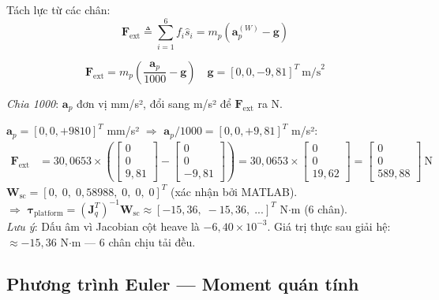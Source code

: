 \documentclass[12pt,a4paper]{article}
\newcommand{\Jq}{\mathbf{J}_q}
\newcommand{\tauv}{\boldsymbol{\tau}}
\newcommand{\Wsc}{\mathbf{W}_{\mathrm{sc}}}
\newcommand{\Fv}{\mathbf{F}}
\newcommand{\shat}{\hat{s}}
\newcommand{\ap}{\mathbf{a}_p}
\newcommand{\gv}{\mathbf{g}}
\begin{document}
Tách lực từ các chân:
\begin{equation}
  \Fv_{\text{ext}} \triangleq \sum_{i=1}^{6}f_i\shat_i = m_p(\ap^{(W)} - \gv)
  \label{eq:Fext}
\end{equation}

\begin{equation}
\boxed{\Fv_{\text{ext}} = m_p\!\left(\frac{\ap}{1000} - \gv\right)}
\quad \gv = [0{,}0{,}-9{,}81]^T\ \text{m/s}^2
\label{eq:Newton}
\end{equation}

\textit{Chia 1000}: $\ap$ đơn vị mm/s², đổi sang m/s² để $\Fv_{\text{ext}}$ ra N.

\begin{numbox}[frametitle={Lực $F_{\text{ext}}$: quỹ đạo heave $a_z{=}+1g$ --- kết quả MATLAB}]
$\ap = [0{,}0{,}+9810]^T$ mm/s² $\Rightarrow$ $\ap/1000 = [0{,}0{,}+9{,}81]^T$ m/s²:
\begin{align*}
  \Fv_{\text{ext}} &= 30{,}0653\times\!\left(\begin{bmatrix}0\\0\\9{,}81\end{bmatrix}
  - \begin{bmatrix}0\\0\\-9{,}81\end{bmatrix}\right)
  = 30{,}0653 \times \begin{bmatrix}0\\0\\19{,}62\end{bmatrix}
  = \begin{bmatrix}0\\0\\589{,}88\end{bmatrix}\ \text{N}
\end{align*}
$\Wsc = [0{,}\;0{,}\;0{,}58988{,}\;0{,}\;0{,}\;0]^T$ (xác nhận bởi MATLAB).\\[4pt]
$\Rightarrow$ $\tauv_{\text{platform}} = (\Jq^T)^{-1}\Wsc \approx [-15{,}36{,}\;-15{,}36{,}\;...]^T$ N$\cdot$m (6 chân).\\[2pt]
\textit{Lưu ý}: Dấu âm vì Jacobian cột heave là $-6{,}40\times10^{-3}$.
Giá trị thực sau giải hệ: $\approx -15{,}36$ N$\cdot$m --- 6 chân chịu tải đều.
\end{numbox}

\subsection{Phương trình Euler --- Moment quán tính}
\end{document}
